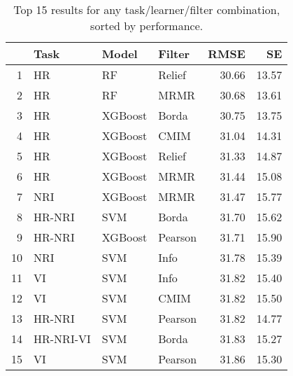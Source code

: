 \begin{table}[ht!]
\centering
\caption{Top 15 results for any task/learner/filter combination, sorted by performance.} 
\label{tab:perf-top-15}
\begin{tabular}{rlllrr}
  \hline
 & Task & Model & Filter & RMSE & SE \\ 
  \hline
1 & HR & RF & Relief & 30.66 & 13.57 \\ 
  2 & HR & RF & MRMR & 30.68 & 13.61 \\ 
  3 & HR & XGBoost & Borda & 30.75 & 13.75 \\ 
  4 & HR & XGBoost & CMIM & 31.04 & 14.31 \\ 
  5 & HR & XGBoost & Relief & 31.33 & 14.87 \\ 
  6 & HR & XGBoost & MRMR & 31.44 & 15.08 \\ 
  7 & NRI & XGBoost & MRMR & 31.47 & 15.77 \\ 
  8 & HR-NRI & SVM & Borda & 31.70 & 15.62 \\ 
  9 & HR-NRI & XGBoost & Pearson & 31.71 & 15.90 \\ 
  10 & NRI & SVM & Info & 31.78 & 15.39 \\ 
  11 & VI & SVM & Info & 31.82 & 15.40 \\ 
  12 & VI & SVM & CMIM & 31.82 & 15.50 \\ 
  13 & HR-NRI & SVM & Pearson & 31.82 & 14.77 \\ 
  14 & HR-NRI-VI & SVM & Borda & 31.83 & 15.27 \\ 
  15 & VI & SVM & Pearson & 31.86 & 15.30 \\ 
   \hline
\end{tabular}
\end{table}
